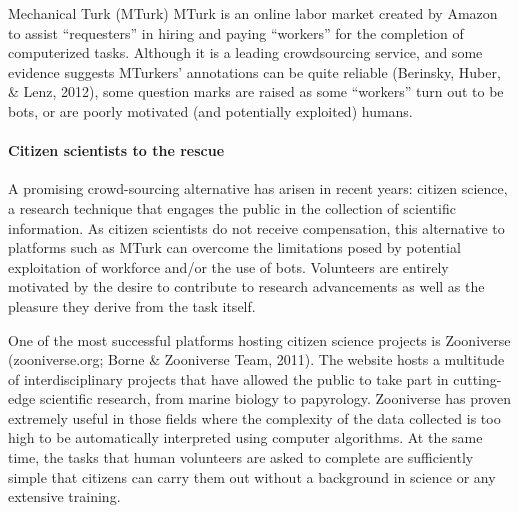\documentclass[english,,man]{apa6}
\begin{document}
Mechanical Turk (MTurk) MTurk is an online labor market created by Amazon to assist \enquote{requesters} in hiring and paying \enquote{workers} for the completion of computerized tasks. Although it is a leading crowdsourcing service, and some evidence suggests MTurkers' annotations can be quite reliable (Berinsky, Huber, \& Lenz, 2012), some question marks are raised as some \enquote{workers} turn out to be bots, or are poorly motivated (and potentially exploited) humans.

\hypertarget{citizen-scientists-to-the-rescue}{%
\paragraph{Citizen scientists to the rescue}\label{citizen-scientists-to-the-rescue}}

A promising crowd-sourcing alternative has arisen in recent years: citizen science, a research technique that engages the public in the collection of scientific information. As citizen scientists do not receive compensation, this alternative to platforms such as MTurk can overcome the limitations posed by potential exploitation of workforce and/or the use of bots. Volunteers are entirely motivated by the desire to contribute to research advancements as well as the pleasure they derive from the task itself.

One of the most successful platforms hosting citizen science projects is Zooniverse (zooniverse.org; Borne \& Zooniverse Team, 2011). The website hosts a multitude of interdisciplinary projects that have allowed the public to take part in cutting-edge scientific research, from marine biology to papyrology. Zooniverse has proven extremely useful in those fields where the complexity of the data collected is too high to be automatically interpreted using computer algorithms. At the same time, the tasks that human volunteers are asked to complete are sufficiently simple that citizens can carry them out without a background in science or any extensive training.
\end{document}
